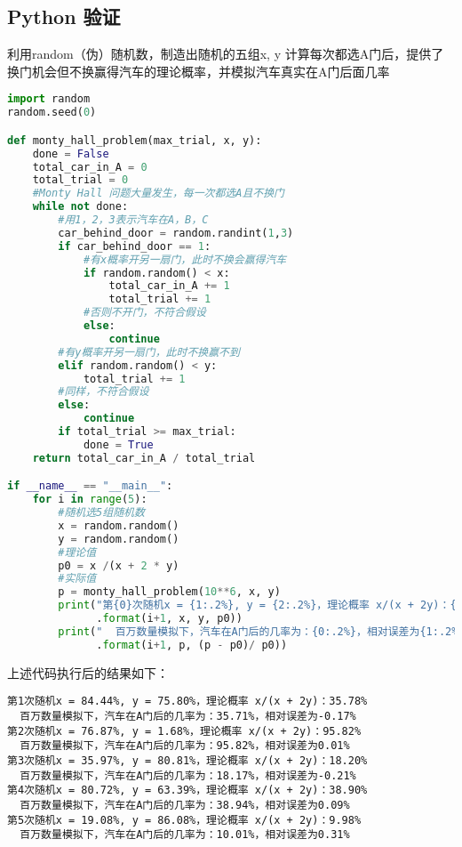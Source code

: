 \subsection{Python 验证}
利用random（伪）随机数，制造出随机的五组x, y 计算每次都选A门后，提供了换门机会但不换赢得汽车的理论概率，并模拟汽车真实在A门后面几率

\begin{lstlisting}[language=python]
import random
random.seed(0)

def monty_hall_problem(max_trial, x, y):
    done = False
    total_car_in_A = 0
    total_trial = 0
    #Monty Hall 问题大量发生，每一次都选A且不换门
    while not done:
        #用1，2，3表示汽车在A，B，C
        car_behind_door = random.randint(1,3)
        if car_behind_door == 1:
            #有x概率开另一扇门，此时不换会赢得汽车
            if random.random() < x:
                total_car_in_A += 1
                total_trial += 1
            #否则不开门，不符合假设
            else:
                continue
        #有y概率开另一扇门，此时不换赢不到
        elif random.random() < y:
            total_trial += 1
        #同样，不符合假设
        else:
            continue
        if total_trial >= max_trial:
            done = True
    return total_car_in_A / total_trial

if __name__ == "__main__":
    for i in range(5):
        #随机选5组随机数
        x = random.random()
        y = random.random()
        #理论值
        p0 = x /(x + 2 * y)
        #实际值
        p = monty_hall_problem(10**6, x, y)
        print("第{0}次随机x = {1:.2%}, y = {2:.2%}，理论概率 x/(x + 2y)：{3:.2%}"
              .format(i+1, x, y, p0))
        print("  百万数量模拟下，汽车在A门后的几率为：{0:.2%}，相对误差为{1:.2%}"
              .format(i+1, p, (p - p0)/ p0))
\end{lstlisting}

上述代码执行后的结果如下：

\begin{lstlisting}[language=pythonC]
第1次随机x = 84.44%, y = 75.80%，理论概率 x/(x + 2y)：35.78%
  百万数量模拟下，汽车在A门后的几率为：35.71%，相对误差为-0.17%
第2次随机x = 76.87%, y = 1.68%，理论概率 x/(x + 2y)：95.82%
  百万数量模拟下，汽车在A门后的几率为：95.82%，相对误差为0.01%
第3次随机x = 35.97%, y = 80.81%，理论概率 x/(x + 2y)：18.20%
  百万数量模拟下，汽车在A门后的几率为：18.17%，相对误差为-0.21%
第4次随机x = 80.72%, y = 63.39%，理论概率 x/(x + 2y)：38.90%
  百万数量模拟下，汽车在A门后的几率为：38.94%，相对误差为0.09%
第5次随机x = 19.08%, y = 86.08%，理论概率 x/(x + 2y)：9.98%
  百万数量模拟下，汽车在A门后的几率为：10.01%，相对误差为0.31%
\end{lstlisting}

